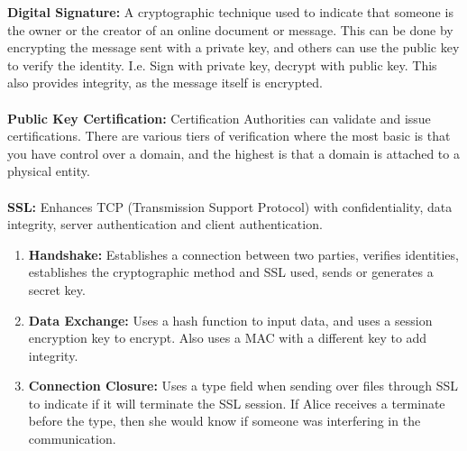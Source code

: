 \documentclass[a4paper,10pt]{article}
\begin{document}
\textcolor{Peach}{\textbf{Digital Signature:}} A cryptographic technique used to indicate that someone is the owner or the creator of an online document or message. This can be done by encrypting the message sent with a private key, and others can use the public key to verify the identity. I.e. Sign with private key, decrypt with public key. This also provides integrity, as the message itself is encrypted.\\\\
\textcolor{Peach}{\textbf{Public Key Certification:}} Certification Authorities can validate and issue certifications. There are various tiers of verification where the most basic is that you have control over a domain, and the highest is that a domain is attached to a physical entity. \\\\
\textcolor{Peach}{\textbf{SSL:}} Enhances TCP (Transmission Support Protocol) with confidentiality, data integrity, server authentication and client authentication.
\renewcommand{\labelitemi}{\textperiodcentered}
\begin{enumerate}
	\item \textbf{Handshake:} Establishes a connection between two parties, verifies identities, establishes the cryptographic method and SSL used, sends or generates a secret key.  
	\item \textbf{Data Exchange:} Uses a hash function to input data, and uses a session encryption key to encrypt. Also uses a MAC with a different key to add integrity.
	\item \textbf{Connection Closure:} Uses a type field when sending over files through SSL to indicate if it will terminate the SSL session. If Alice receives a terminate before the type, then she would know if someone was interfering in the communication. 
\end{enumerate} 
\end{document}
